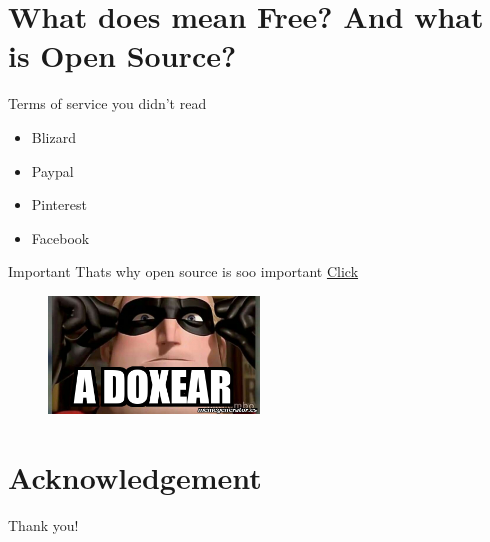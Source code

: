 \documentclass[10pt]{beamer}
\begin{document}
\section{What does mean Free? And what is Open Source?}


    \begin{frame}{Terms of service you didn't read }
      \begin{itemize}
        \item Blizard
        \item Paypal
        \item Pinterest
        \item Facebook
      \end{itemize}
      \begin{alertblock}{Important}
        Thats why open source is soo important \newline
        \href{https://tosdr.org/}{Click}
      \end{alertblock}
      \begin{figure}[h]
        \centering
        \includegraphics[width=0.5\textwidth]{figures/DoxingMeme.jpg}
        \label{fig:my_label}
        \end{figure}
    \end{frame}



\section*{Acknowledgement}  
\begin{frame}
\textcolor{myNewColorA}{\Huge{\centerline{Thank you!}}}
\end{frame}
\end{document}

